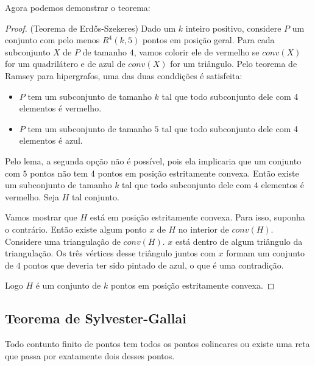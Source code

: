 \documentclass[a4paper]{book}
\begin{document}
    Agora podemos demonstrar o teorema:
\begin{proof}(Teorema de Erd\H os-Szekeres)
    Dado um $k$ inteiro positivo, considere $P$ um conjunto com pelo menos $R^4(k,5)$ pontos em posição geral. Para cada subconjunto $X$ de $P$ de tamanho $4$, vamos colorir ele de vermelho se $conv(X)$ for um quadrilátero e de azul de $conv(X)$ for um triângulo. Pelo teorema de Ramsey para hipergrafos, uma das duas conddições é satisfeita:
    \begin{itemize}
        \item $P$ tem um subconjunto de tamanho $k$ tal que todo subconjunto dele com 4 elementos é vermelho.
        \item $P$ tem um subconjunto de tamanho $5$ tal que todo subconjunto dele com 4 elementos é azul.
    \end{itemize}
    Pelo lema, a segunda opção não é possível, pois ela implicaria que um conjunto com $5$ pontos não tem 4 pontos em posição estritamente convexa. Então existe um subconjunto de tamanho $k$ tal que todo subconjunto dele com $4$ elementos é vermelho. Seja $H$ tal conjunto.

    Vamos mostrar que $H$ está em posição estritamente convexa. Para isso, suponha o contrário. Então existe algum ponto $x$ de $H$ no interior de $conv(H)$. Considere uma triangulação de $conv(H)$. $x$ está dentro de algum triângulo da triangulação. Os três vértices desse triângulo juntos com $x$ formam um conjunto de $4$ pontos que deveria ter sido pintado de azul, o que é uma contradição.

    Logo $H$ é um conjunto de $k$ pontos em posição estritamente convexa.
\end{proof}

\subsection{Teorema de Sylvester-Gallai}
Todo contunto finito de pontos tem todos os pontos colineares ou existe uma reta que passa por exatamente dois desses pontos.
\end{document}
